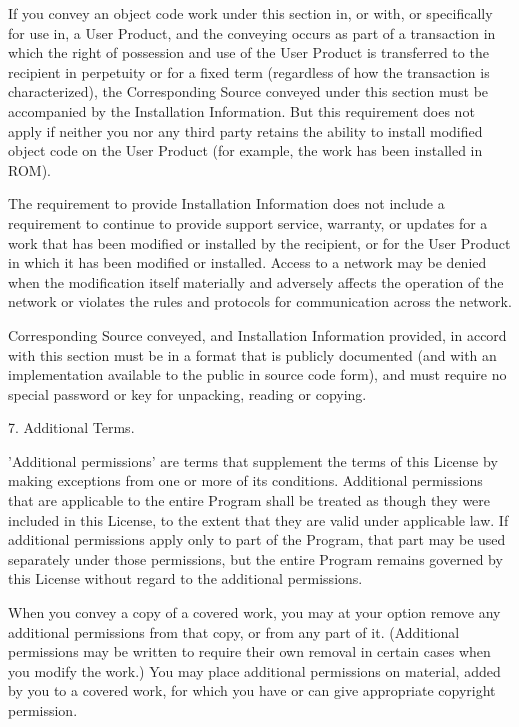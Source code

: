 \documentclass{article}
\begin{document}
  If you convey an object code work under this section in, or with, or
specifically for use in, a User Product, and the conveying occurs as
part of a transaction in which the right of possession and use of the
User Product is transferred to the recipient in perpetuity or for a
fixed term (regardless of how the transaction is characterized), the
Corresponding Source conveyed under this section must be accompanied
by the Installation Information.  But this requirement does not apply
if neither you nor any third party retains the ability to install
modified object code on the User Product (for example, the work has
been installed in ROM).

  The requirement to provide Installation Information does not include a
requirement to continue to provide support service, warranty, or updates
for a work that has been modified or installed by the recipient, or for
the User Product in which it has been modified or installed.  Access to a
network may be denied when the modification itself materially and
adversely affects the operation of the network or violates the rules and
protocols for communication across the network.

  Corresponding Source conveyed, and Installation Information provided,
in accord with this section must be in a format that is publicly
documented (and with an implementation available to the public in
source code form), and must require no special password or key for
unpacking, reading or copying.

  7. Additional Terms.

  'Additional permissions' are terms that supplement the terms of this
License by making exceptions from one or more of its conditions.
Additional permissions that are applicable to the entire Program shall
be treated as though they were included in this License, to the extent
that they are valid under applicable law.  If additional permissions
apply only to part of the Program, that part may be used separately
under those permissions, but the entire Program remains governed by
this License without regard to the additional permissions.

  When you convey a copy of a covered work, you may at your option
remove any additional permissions from that copy, or from any part of
it.  (Additional permissions may be written to require their own
removal in certain cases when you modify the work.)  You may place
additional permissions on material, added by you to a covered work,
for which you have or can give appropriate copyright permission.
\end{document}
